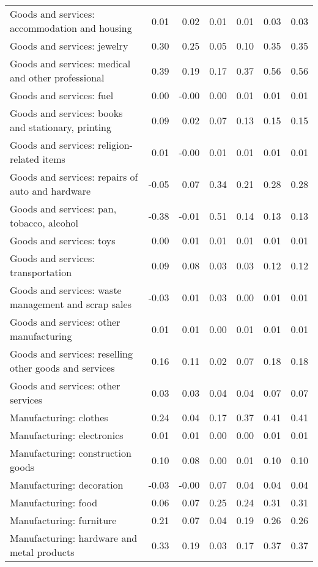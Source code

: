 \begin{longtable}{lrrrrrr}
  Goods and services: accommodation and housing & 0.01 & 0.02 & 0.01 & 0.01 & 0.03 & 0.03 \\ 
  Goods and services: jewelry & 0.30 & 0.25 & 0.05 & 0.10 & 0.35 & 0.35 \\ 
  Goods and services: medical and other professional & 0.39 & 0.19 & 0.17 & 0.37 & 0.56 & 0.56 \\ 
  Goods and services: fuel & 0.00 & -0.00 & 0.00 & 0.01 & 0.01 & 0.01 \\ 
  Goods and services: books and stationary, printing & 0.09 & 0.02 & 0.07 & 0.13 & 0.15 & 0.15 \\ 
  Goods and services: religion-related items & 0.01 & -0.00 & 0.01 & 0.01 & 0.01 & 0.01 \\ 
  Goods and services: repairs of  auto and hardware & -0.05 & 0.07 & 0.34 & 0.21 & 0.28 & 0.28 \\ 
  Goods and services: pan, tobacco, alcohol & -0.38 & -0.01 & 0.51 & 0.14 & 0.13 & 0.13 \\ 
  Goods and services: toys & 0.00 & 0.01 & 0.01 & 0.01 & 0.01 & 0.01 \\ 
  Goods and services: transportation & 0.09 & 0.08 & 0.03 & 0.03 & 0.12 & 0.12 \\ 
  Goods and services: waste management and scrap sales & -0.03 & 0.01 & 0.03 & 0.00 & 0.01 & 0.01 \\ 
  Goods and services: other manufacturing & 0.01 & 0.01 & 0.00 & 0.01 & 0.01 & 0.01 \\ 
  Goods and services: reselling other goods and services & 0.16 & 0.11 & 0.02 & 0.07 & 0.18 & 0.18 \\ 
  Goods and services: other services & 0.03 & 0.03 & 0.04 & 0.04 & 0.07 & 0.07 \\ 
  Manufacturing: clothes & 0.24 & 0.04 & 0.17 & 0.37 & 0.41 & 0.41 \\ 
  Manufacturing: electronics & 0.01 & 0.01 & 0.00 & 0.00 & 0.01 & 0.01 \\ 
  Manufacturing: construction goods & 0.10 & 0.08 & 0.00 & 0.01 & 0.10 & 0.10 \\ 
  Manufacturing: decoration & -0.03 & -0.00 & 0.07 & 0.04 & 0.04 & 0.04 \\ 
  Manufacturing: food & 0.06 & 0.07 & 0.25 & 0.24 & 0.31 & 0.31 \\ 
  Manufacturing: furniture & 0.21 & 0.07 & 0.04 & 0.19 & 0.26 & 0.26 \\ 
  Manufacturing: hardware and metal products & 0.33 & 0.19 & 0.03 & 0.17 & 0.37 & 0.37 \\ 

\end{longtable}
